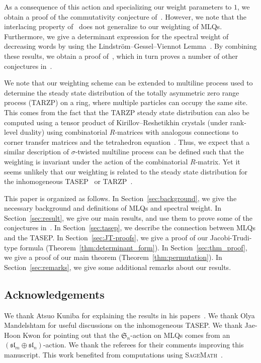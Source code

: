 \documentclass[reqno]{amsart}
\newcommand{\0}{\phantom{c}}
\newcommand{\SymGp}[1]{\mathfrak{S}_{#1}} %
\theoremstyle{plain}
\theoremstyle{definition}
\numberwithin{equation}{section}
\begin{document}
As a consequence of this action and specializing our weight parameters to $1$, we obtain a proof of the commutativity conjecture of~\cite{AAMP}.
However, we note that the interlacing property of~\cite{AAMP} does not generalize to our weighting of MLQs.
Furthermore, we give a determinant expression for the spectral weight of decreasing words by using the Lindstr\"om--Gessel--Viennot Lemma~\cite{GV85,Lindstrom73}.
By combining these results, we obtain a proof of~\cite[Conj.~3.10]{AasLin17}, which in turn proves a number of other conjectures in~\cite{AasLin17}.

We note that our weighting scheme can be extended to multiline process used to determine the steady state distribution of the totally asymmetric zero range process (TARZP) on a ring, where multiple particles can occupy the same site.
This comes from the fact that the TARZP steady state distribution can also be computed using a tensor product of Kirillov--Reshetikhin crystals (under rank-level duality) using combinatorial $R$-matrices with analogous connections to corner transfer matrices and the tetrahedron equation~\cite{KMO16TARZP,KMO16TARZPII}.
Thus, we expect that a similar description of $\sigma$-twisted multiline process can be defined such that the weighting is invariant under the action of the combinatorial $R$-matrix.
Yet it seems unlikely that our weighting is related to the steady state distribution for the inhomogeneous TASEP~\cite{AM13,AL14} or TARZP~\cite{KMO16II}.

This paper is organized as follows.
In Section~\ref{sec:background}, we give the necessary background and definitions of MLQs and spectral weight.
In Section~\ref{sec:result}, we give our main results, and use them to prove some of the conjectures in~\cite{AasLin17}.
In Section~\ref{sec:tasep}, we describe the connection between MLQs and the TASEP.
In Section~\ref{sec:JT-proofs}, we give a proof of our Jacobi-Trudi-type formula (Theorem~\ref{thm:determinant_form}).
In Section~\ref{sec:thm_proof}, we give a proof of our main theorem (Theorem~\ref{thm:permutation}).
In Section~\ref{sec:remarks}, we give some additional remarks about our results.


\subsection{Acknowledgements}

We thank Atsuo Kuniba for explaining the results in his papers~\cite{KMO15,KMO16II,KMO16,KMO16TARZP,KMO16TARZPII}.
We thank Olya Mandelshtam for useful discussions on the inhomogeneous TASEP.
We thank Jae-Hoon Kwon for pointing out that the $\SymGp{n}$-action on MLQs comes from an $(\mathfrak{sl}_m \oplus \mathfrak{sl}_n)$-action.
We thank the referees for their comments improving this manuscript.
This work benefited from computations using \textsc{SageMath}~\cite{sage,combinat}.
\end{document}
